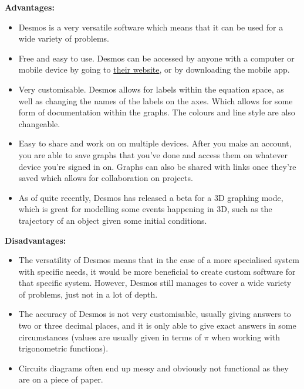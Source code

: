 \documentclass[11pt]{article}
\begin{document}
                \pagebreak
                \textbf{Advantages:}
                \begin{itemize}
                    \item Desmos is a very versatile software which means that it can be used for a wide variety of problems. 
                    \item Free and easy to use. Desmos can be accessed by anyone with a computer or mobile device by going to \href{https://www.desmos.com/calculator}{their website}, or by downloading the mobile app.
                    \item Very customisable. Desmos allows for labels within the equation space, as well as changing the names of the labels on the axes. Which allows for some form of documentation within the graphs. The colours and line style are also changeable.
                    \item Easy to share and work on on multiple devices. After you make an account, you are able to save graphs that you've done and access them on whatever device you're signed in on. Graphs can also be shared with links once they're saved which allows for collaboration on projects.
                    \item As of quite recently, Desmos has released a beta for a 3D graphing mode, which is great for modelling some events happening in 3D, such as the trajectory of an object given some initial conditions.
                \end{itemize}

                \textbf{Disadvantages:}
                \begin{itemize}
                    \item The versatility of Desmos means that in the case of a more specialised system with specific needs, it would be more beneficial to create custom software for that specific system. However, Desmos still manages to cover a wide variety of problems, just not in a lot of depth.
                    \item The accuracy of Desmos is not very customisable, usually giving answers to two or three decimal places, and it is only able to give exact answers in some circumstances (values are usually given in terms of $\pi$ when working with trigonometric functions).
                    \item Circuits diagrams often end up messy and obviously not functional as they are on a piece of paper.
                \end{itemize}
\end{document}
